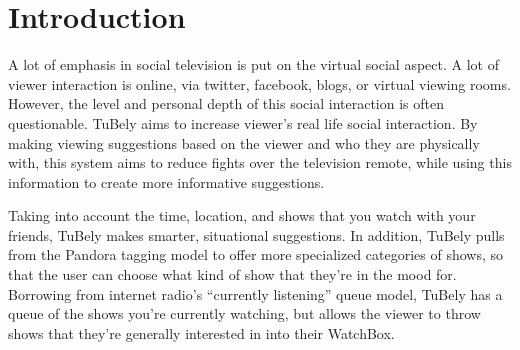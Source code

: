 \section{Introduction}

A lot of emphasis in social television is put on the virtual social
aspect.  A lot of viewer interaction is online, via twitter, facebook,
blogs, or virtual viewing rooms.  However, the level and personal
depth of this social interaction is often questionable.  TuBely aims
to increase viewer’s real life social interaction.  By making viewing
suggestions based on the viewer and who they are physically with, this
system aims to reduce fights over the television remote, while using
this information to create more informative suggestions.

Taking into account the time, location, and shows that you watch with
your friends, TuBely makes smarter, situational suggestions.  In
addition, TuBely pulls from the Pandora tagging model to offer more
specialized categories of shows, so that the user can choose what kind
of show that they’re in the mood for.  Borrowing from internet radio’s
“currently listening” queue model, TuBely has a queue of the shows
you’re currently watching, but allows the viewer to throw shows that
they’re generally interested in into their WatchBox.
